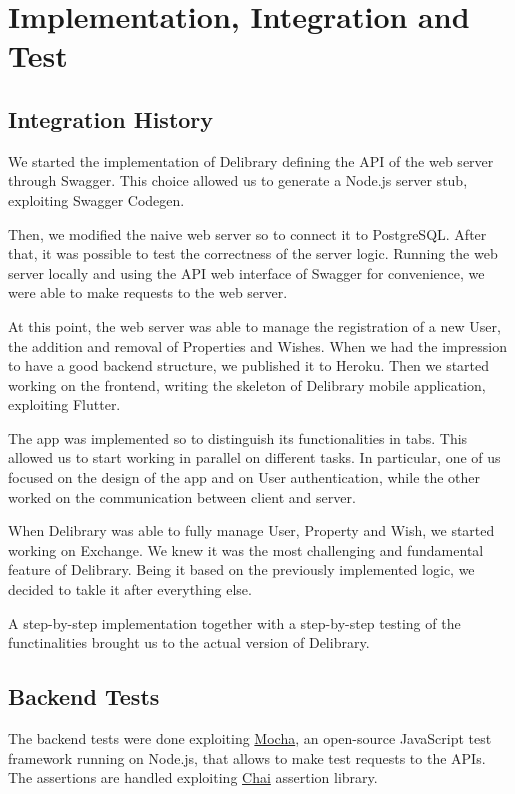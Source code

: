 \chapter{Implementation, Integration and Test}

\section{Integration History}
We started the implementation of Delibrary defining the API of the web server through Swagger.
This choice allowed us to generate a Node.js server stub, exploiting Swagger Codegen.

Then, we modified the naive web server so to connect it to PostgreSQL.
After that, it was possible to test the correctness of the server logic.
Running the web server locally and using the API web interface of Swagger for convenience, we were able to make requests to the web server.

At this point, the web server was able to manage the registration of a new User, the addition and removal of Properties and Wishes.
When we had the impression to have a good backend structure, we published it to Heroku.
Then we started working on the frontend, writing the skeleton of Delibrary mobile application, exploiting Flutter.

The app was implemented so to distinguish its functionalities in tabs. This allowed us to start working in parallel on different tasks.
In particular, one of us focused on the design of the app and on User authentication, while the other worked on the communication between client and server.

When Delibrary was able to fully manage User, Property and Wish, we started working on Exchange.
We knew it was the most challenging and fundamental feature of Delibrary.
Being it based on the previously implemented logic, we decided to takle it after everything else.

A step-by-step implementation together with a step-by-step testing of the functinalities brought us to the actual version of Delibrary.

\section{Backend Tests}
The backend tests were done exploiting \href{https://mochajs.org}{Mocha}, an open-source JavaScript test framework running on Node.js, that allows to make test requests to the APIs.
The assertions are handled exploiting \href{https://www.chaijs.com/}{Chai} assertion library.

